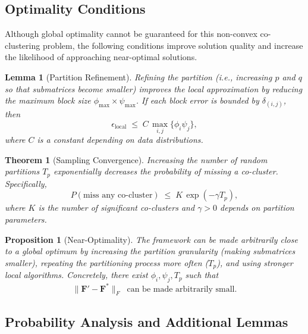 \documentclass[journal]{IEEEtran}
\newtheorem{theorem}{Theorem}
\newtheorem{lemma}{Lemma}
\newtheorem{proposition}{Proposition}
\begin{document}
\subsection{Optimality Conditions}
\label{subsec:optimality_conditions}

Although global optimality cannot be guaranteed for this non-convex co-clustering problem, the following conditions improve solution quality and increase the likelihood of approaching near-optimal solutions.

\begin{lemma}[Partition Refinement]
    \label{lem:partition_refinement}
    Refining the partition (i.e., increasing \(p\) and \(q\) so that submatrices become smaller) improves the local approximation by reducing the maximum block size \(\phi_{\max}\times\psi_{\max}\). If each block error is bounded by \(\delta_{(i,j)}\), then
    \begin{equation}
        \epsilon_{\text{local}} \;\le\; C \,\max_{i,j}\{\phi_i\psi_j\},
    \end{equation}
    where \(C\) is a constant depending on data distributions.
\end{lemma}

\begin{theorem}[Sampling Convergence]
    \label{thm:sampling_convergence_appendix}
    Increasing the number of random partitions \(T_p\) exponentially decreases the probability of missing a co-cluster. Specifically,
    \begin{equation}
        P(\text{miss any co-cluster} ) \;\le\; K\,\exp(-\gamma T_p),
    \end{equation}
    where \(K\) is the number of significant co-clusters and \(\gamma>0\) depends on partition parameters.
\end{theorem}

\begin{proposition}[Near-Optimality]
    \label{prop:near_optimality}
    The framework can be made arbitrarily close to a global optimum by increasing the partition granularity (making submatrices smaller), repeating the partitioning process more often (\(T_p\)), and using stronger local algorithms. Concretely, there exist \(\phi_i, \psi_j, T_p\) such that
    \begin{equation}
        \|\mathbf{F}' - \mathbf{F}^*\|_F \;\; \text{can be made arbitrarily small.}
    \end{equation}
\end{proposition}

\subsection{Probability Analysis and Additional Lemmas}
\label{subsec:probability_analysis}
\end{document}
